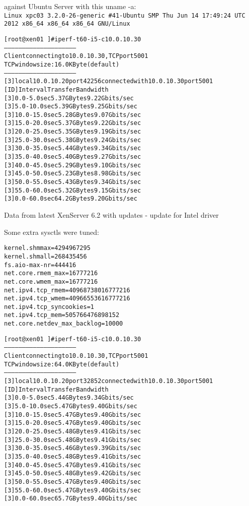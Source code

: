 \documentclass[20pt,landscape,a4paper,footrule]{foils}
\begin{document}
against Ubuntu Server with this uname -a:\\
{\small \verb+Linux xpc03 3.2.0-26-generic #41-Ubuntu SMP Thu Jun 14 17:49:24 UTC 2012 x86_64 x86_64 x86_64 GNU/Linux+}


\begin{alltt}\scriptsize
[root@xen01 ~]# iperf -t 60 -i 5 -c 10.0.10.30
------------------------------------------------------------
Client connecting to 10.0.10.30, TCP port 5001
TCP window size: 16.0 KByte (default)
------------------------------------------------------------
[  3] local 10.0.10.20 port 42256 connected with 10.0.10.30 port 5001
[ ID] Interval       Transfer     Bandwidth
[  3]  0.0- 5.0 sec  5.37 GBytes  9.22 Gbits/sec
[  3]  5.0-10.0 sec  5.39 GBytes  9.25 Gbits/sec
[  3] 10.0-15.0 sec  5.28 GBytes  9.07 Gbits/sec
[  3] 15.0-20.0 sec  5.37 GBytes  9.22 Gbits/sec
[  3] 20.0-25.0 sec  5.35 GBytes  9.19 Gbits/sec
[  3] 25.0-30.0 sec  5.38 GBytes  9.24 Gbits/sec
[  3] 30.0-35.0 sec  5.44 GBytes  9.34 Gbits/sec
[  3] 35.0-40.0 sec  5.40 GBytes  9.27 Gbits/sec
[  3] 40.0-45.0 sec  5.29 GBytes  9.10 Gbits/sec
[  3] 45.0-50.0 sec  5.23 GBytes  8.98 Gbits/sec
[  3] 50.0-55.0 sec  5.43 GBytes  9.34 Gbits/sec
[  3] 55.0-60.0 sec  5.32 GBytes  9.15 Gbits/sec
[  3]  0.0-60.0 sec  64.2 GBytes  9.20 Gbits/sec
\end{alltt}

Data from latest XenServer 6.2 with updates - update for Intel driver


Some extra sysctls were tuned:
\begin{alltt}
kernel.shmmax = 4294967295
kernel.shmall = 268435456
fs.aio-max-nr = 444416
net.core.rmem_max = 16777216
net.core.wmem_max = 16777216
net.ipv4.tcp_rmem = 4096 87380 16777216
net.ipv4.tcp_wmem = 4096 65536 16777216
net.ipv4.tcp_syncookies = 1
net.ipv4.tcp_mem = 50576   64768   98152
net.core.netdev_max_backlog = 10000
\end{alltt}

\begin{alltt}\scriptsize
[root@xen01 ~]# iperf -t 60 -i 5 -c 10.0.10.30
------------------------------------------------------------
Client connecting to 10.0.10.30, TCP port 5001
TCP window size: 64.0 KByte (default)
------------------------------------------------------------
[  3] local 10.0.10.20 port 32852 connected with 10.0.10.30 port 5001
[ ID] Interval       Transfer     Bandwidth
[  3]  0.0- 5.0 sec  5.44 GBytes  9.34 Gbits/sec
[  3]  5.0-10.0 sec  5.47 GBytes  9.40 Gbits/sec
[  3] 10.0-15.0 sec  5.47 GBytes  9.40 Gbits/sec
[  3] 15.0-20.0 sec  5.47 GBytes  9.40 Gbits/sec
[  3] 20.0-25.0 sec  5.48 GBytes  9.41 Gbits/sec
[  3] 25.0-30.0 sec  5.48 GBytes  9.41 Gbits/sec
[  3] 30.0-35.0 sec  5.46 GBytes  9.39 Gbits/sec
[  3] 35.0-40.0 sec  5.48 GBytes  9.41 Gbits/sec
[  3] 40.0-45.0 sec  5.47 GBytes  9.41 Gbits/sec
[  3] 45.0-50.0 sec  5.48 GBytes  9.42 Gbits/sec
[  3] 50.0-55.0 sec  5.47 GBytes  9.40 Gbits/sec
[  3] 55.0-60.0 sec  5.47 GBytes  9.40 Gbits/sec
[  3]  0.0-60.0 sec  65.7 GBytes  9.40 Gbits/sec
\end{alltt}
\end{document}
